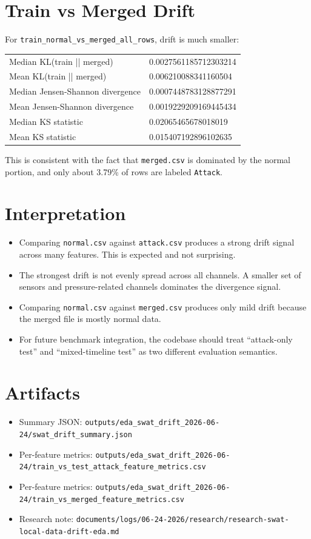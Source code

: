 \documentclass[11pt]{article}
\begin{document}
\section*{Train vs Merged Drift}
For \texttt{train\_normal\_vs\_merged\_all\_rows}, drift is much smaller:

\begin{longtable}{@{}ll@{}}
\toprule
Median KL(train || merged) & 0.0027561185712303214 \\
Mean KL(train || merged) & 0.006210088341160504 \\
Median Jensen-Shannon divergence & 0.0007448783128877291 \\
Mean Jensen-Shannon divergence & 0.0019229209169445434 \\
Median KS statistic & 0.02065465678018019 \\
Mean KS statistic & 0.015407192896102635 \\
\bottomrule
\end{longtable}

This is consistent with the fact that \texttt{merged.csv} is dominated by the normal portion, and only about 3.79\% of rows are labeled \texttt{Attack}.

\section*{Interpretation}
\begin{itemize}
\item Comparing \texttt{normal.csv} against \texttt{attack.csv} produces a strong drift signal across many features. This is expected and not surprising.
\item The strongest drift is not evenly spread across all channels. A smaller set of sensors and pressure-related channels dominates the divergence signal.
\item Comparing \texttt{normal.csv} against \texttt{merged.csv} produces only mild drift because the merged file is mostly normal data.
\item For future benchmark integration, the codebase should treat ``attack-only test'' and ``mixed-timeline test'' as two different evaluation semantics.
\end{itemize}

\section*{Artifacts}
\begin{itemize}
\item Summary JSON: \texttt{outputs/eda\_swat\_drift\_2026-06-24/swat\_drift\_summary.json}
\item Per-feature metrics: \texttt{outputs/eda\_swat\_drift\_2026-06-24/train\_vs\_test\_attack\_feature\_metrics.csv}
\item Per-feature metrics: \texttt{outputs/eda\_swat\_drift\_2026-06-24/train\_vs\_merged\_feature\_metrics.csv}
\item Research note: \texttt{documents/logs/06-24-2026/research/research-swat-local-data-drift-eda.md}
\end{itemize}
\end{document}

